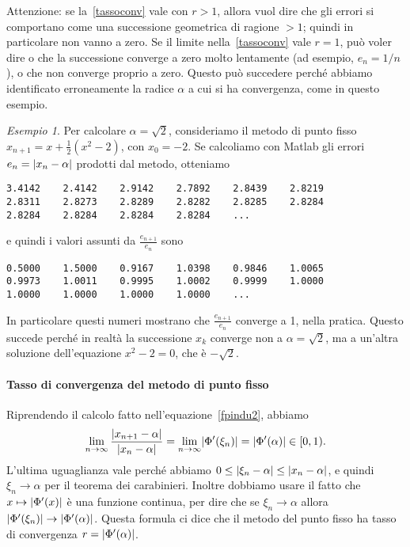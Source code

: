 \documentclass[a4paper]{report}
\DeclarePairedDelimiter{\abs}{\lvert}{\rvert}
\theoremstyle{definiton}
\theoremstyle{remark}
\newtheorem{esempio}[theorem]{Esempio}
\begin{document}
Attenzione: se la~\eqref{tassoconv} vale con $r>1$, allora vuol dire che gli errori si comportano come una successione geometrica di ragione $>1$; quindi in particolare non vanno a zero. Se il limite nella~\eqref{tassoconv} vale $r=1$, può voler dire o che la successione converge a zero molto lentamente (ad esempio, $e_n = 1/n$), o che non converge proprio a zero. Questo può succedere perché abbiamo identificato erroneamente la radice $\alpha$ a cui si ha convergenza, come in questo esempio.
\begin{esempio}
    Per calcolare $\alpha = \sqrt{2}$, consideriamo il metodo di punto fisso $x_{n+1} = x + \frac{1}{2} (x^2-2)$, con $x_0 = -2$. Se calcoliamo con Matlab gli errori $e_n = \abs{x_n - \alpha}$ prodotti dal metodo, otteniamo
    \begin{lstlisting}
3.4142    2.4142    2.9142    2.7892    2.8439    2.8219    
2.8311    2.8273    2.8289    2.8282    2.8285    2.8284
2.8284    2.8284    2.8284    2.8284    ...
    \end{lstlisting}
    e quindi i valori assunti da $\frac{e_{n+1}}{e_n}$ sono
\begin{lstlisting}
0.5000    1.5000    0.9167    1.0398    0.9846    1.0065    
0.9973    1.0011    0.9995    1.0002    0.9999    1.0000
1.0000    1.0000    1.0000    1.0000    ...
\end{lstlisting}
In particolare questi numeri mostrano che $\frac{e_{n+1}}{e_n}$ converge a 1, nella pratica. Questo succede perché in realtà la successione $x_k$ converge non a $\alpha = \sqrt{2}$, ma a un'altra soluzione dell'equazione $x^2-2=0$, che è $-\sqrt{2}$.
\end{esempio}

\paragraph{Tasso di convergenza del metodo di punto fisso} Riprendendo il calcolo fatto nell'equazione~\eqref{fpindu2}, abbiamo
\[
\lim_{n \to \infty} \frac{\abs{x_{n+1} - \alpha}}{\abs{x_n - \alpha}} = \lim_{n\to\infty} \abs{\Phi'(\xi_n)} = \abs{\Phi'(\alpha)} \in [0,1).
\]
L'ultima uguaglianza vale perché abbiamo $0 \leq \abs{\xi_n - \alpha} \leq \abs{x_n - \alpha}$, e quindi $\xi_n \to \alpha$ per il teorema dei carabinieri. Inoltre dobbiamo usare il fatto che $x \mapsto \abs{\Phi'(x)}$ è una funzione continua, per dire che se $\xi_n\to\alpha$ allora $\abs{\Phi'(\xi_n)} \to \abs{\Phi'(\alpha)}$. Questa formula ci dice che il metodo del punto fisso ha tasso di convergenza $r = \abs{\Phi'(\alpha)}$.
\end{document}
